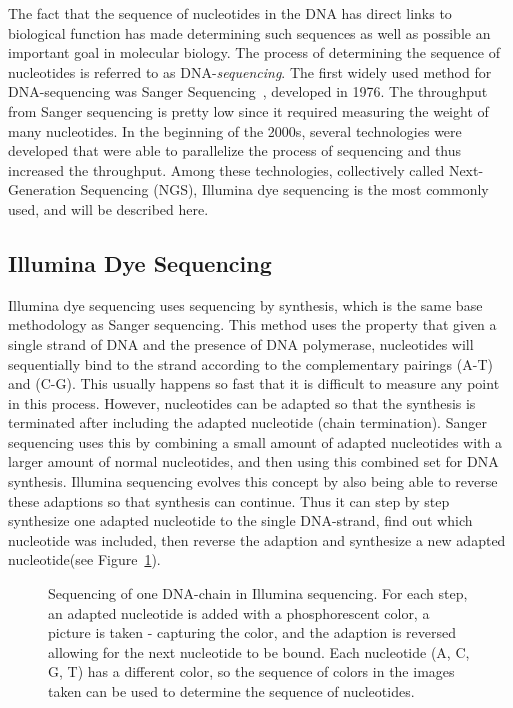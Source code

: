 The fact that the sequence of nucleotides in the DNA has direct links to biological function has made determining such sequences as well as possible an important goal in molecular biology.
The process of determining the sequence of nucleotides is referred to as DNA-\emph{sequencing}.
The first widely used method for DNA-sequencing was Sanger Sequencing~\cite{sanger}, developed in 1976.
The throughput from Sanger sequencing is pretty low since it required measuring the weight of many nucleotides.
In the beginning of the 2000s, several technologies were developed that were able to parallelize the process of sequencing and thus increased the throughput.
Among these technologies, collectively called Next-Generation Sequencing (NGS), Illumina dye sequencing is the most commonly used, and will be described here.

\subsection{Illumina Dye Sequencing}
Illumina dye sequencing uses sequencing by synthesis, which is the same base methodology as Sanger sequencing.
This method uses the property that given a single strand of DNA and the presence of DNA polymerase, nucleotides will sequentially bind to the strand according to the complementary pairings (A-T) and (C-G).
This usually happens so fast that it is difficult to measure any point in this process.
However, nucleotides can be adapted so that the synthesis is terminated after including the adapted nucleotide (chain termination).
Sanger sequencing uses this by combining a small amount of adapted nucleotides with a larger amount of normal nucleotides, and then using this combined set for DNA synthesis.
Illumina sequencing evolves this concept by also being able to reverse these adaptions so that synthesis can continue. Thus it can step by step synthesize one adapted nucleotide to the single DNA-strand, find out which nucleotide was included, then reverse the adaption and synthesize a new adapted nucleotide(see Figure~\ref{fig:illumina}).
\begin{figure}
  \tikzpicture
  
  \endtikzpicture
  \caption{
    Sequencing of one DNA-chain in Illumina sequencing.
    For each step, an adapted nucleotide is added with a phosphorescent color, a picture is taken - capturing the color, and the adaption is reversed allowing for the next nucleotide to be bound.
    Each nucleotide (A, C, G, T) has a different color, so the sequence of colors in the images taken can be used to determine the sequence of nucleotides.}
  \label{fig:illumina}
\end{figure}


